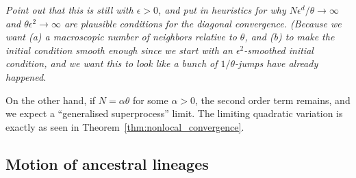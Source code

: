 \documentclass[12pt]{article}
\newcommand{\comment}[1]{{\color{blue} \it #1}}
\begin{document}
\comment{
    Point out that this is still with $\epsilon > 0$,
    and put in heuristics for why $N \epsilon^d / \theta \to \infty$
    and $\theta \epsilon^2 \to \infty$
    are plausible conditions for the diagonal convergence.
    (Because we want (a) a macroscopic number of neighbors relative to $\theta$,
    and (b) to make the initial condition smooth enough
    since we start with an $\epsilon^2$-smoothed initial condition,
    and we want this to look like a bunch of $1/\theta$-jumps have already happened.
}

On the other hand, if $N = \alpha \theta$ for some $\alpha > 0$,
the second order term remains, and we expect a ``generalised superprocess'' limit.
The limiting quadratic variation
is exactly as seen in Theorem~\ref{thm:nonlocal_convergence}.


\subsection{Motion of ancestral lineages}
\end{document}
